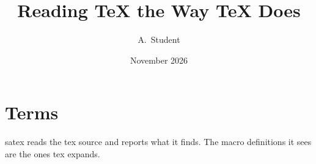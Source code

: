 \documentclass{article}
\title{Reading \TeX{} the Way \TeX{} Does}
\author{A.\ Student}
\date{November 2026}
\begin{document}
\maketitle
\thispagestyle{empty}
\clearpage
\tableofcontents
\listoffigures
\listoftables
\clearpage

\section{Terms}
\Gls{satex} reads the \gls{tex} source and reports what it finds.
The macro definitions it sees are the ones \gls{tex} expands.
\printnoidxglossaries
\printindex


\end{document}
